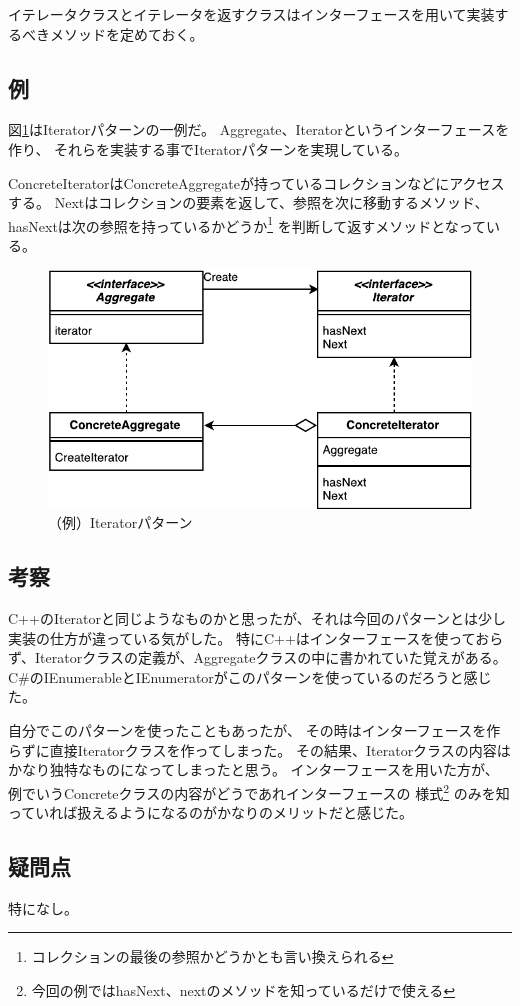 \documentclass[11pt]{jsarticle}
\begin{document}
		イテレータクラスとイテレータを返すクラスはインターフェースを用いて実装するべきメソッドを定めておく。
	\subsection{例}
		図\ref{fig::iterator}はIteratorパターンの一例だ。
		Aggregate、Iteratorというインターフェースを作り、
		それらを実装する事でIteratorパターンを実現している。
		
		ConcreteIteratorはConcreteAggregateが持っているコレクションなどにアクセスする。
		Nextはコレクションの要素を返して、参照を次に移動するメソッド、
		hasNextは次の参照を持っているかどうか\footnote{コレクションの最後の参照かどうかとも言い換えられる}
		を判断して返すメソッドとなっている。
	
		\begin{figure}[htbp]
			\centering
			\includegraphics[width=0.7\hsize]{IteratorPattern-crop.pdf}
			\caption{（例）Iteratorパターン}\label{fig::iterator}
		\end{figure}
		
	\subsection{考察}
		C++のIteratorと同じようなものかと思ったが、それは今回のパターンとは少し実装の仕方が違っている気がした。
		特にC++はインターフェースを使っておらず、Iteratorクラスの定義が、Aggregateクラスの中に書かれていた覚えがある。
		C\#のIEnumerableとIEnumeratorがこのパターンを使っているのだろうと感じた。
		
		自分でこのパターンを使ったこともあったが、
		その時はインターフェースを作らずに直接Iteratorクラスを作ってしまった。
		その結果、Iteratorクラスの内容はかなり独特なものになってしまったと思う。
		インターフェースを用いた方が、例でいうConcreteクラスの内容がどうであれインターフェースの
		様式\footnote{今回の例ではhasNext、nextのメソッドを知っているだけで使える}
		のみを知っていれば扱えるようになるのがかなりのメリットだと感じた。
	\subsection{疑問点}
		特になし。
\end{document}
